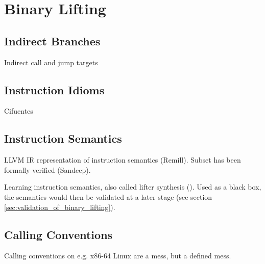 
\section{Binary Lifting}


\subsection{Indirect Branches}

Indirect call and jump targets


\subsection{Instruction Idioms}

Cifuentes


\subsection{Instruction Semantics}

LLVM IR representation of instruction semantics (Remill). Subset has been formally verified (Sandeep).

Learning instruction semantics, also called lifter synthesis (\cite{lifter_synthesis}). Used as a black box, the semantics would then be validated at a later stage (see section \ref{sec:validation_of_binary_lifting}).



\subsection{Calling Conventions}

Calling conventions on e.g. x86-64 Linux are a mess, but a defined mess.

